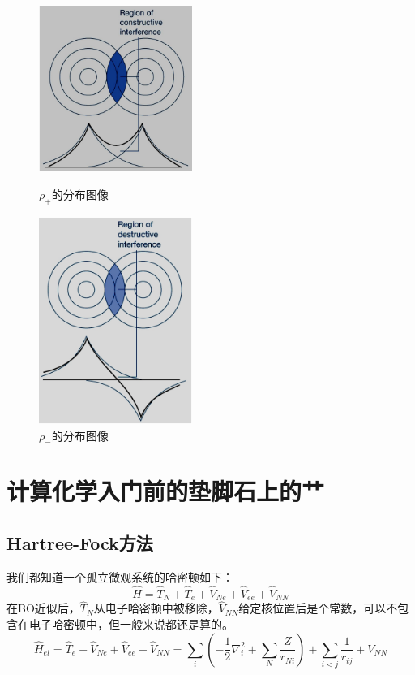 \begin{figure}[htbp]
    \centering
    \begin{minipage}[t]{0.48\textwidth}
    \centering
    \includegraphics[width=5cm]{fig/lzhx/微信图片_20211102112346.png}
    \caption{$\rho_+$的分布图像}
    \end{minipage}
    \begin{minipage}[t]{0.48\textwidth}
    \centering
    \includegraphics[width=5cm]{fig/lzhx/微信图片_202111021123461.png}
    \caption{$\rho_-$的分布图像}
    \end{minipage}
\end{figure}

\section{计算化学入门前的垫脚石上的艹}
\subsection{Hartree-Fock方法}
我们都知道一个孤立微观系统的哈密顿如下：
\[\hat{H}=\hat{T}_N+\hat{T}_e+\hat{V}_{Ne}+\hat{V}_{ee}+\hat{V}_{NN}\]
在BO近似后，$\hat{T}_N$从电子哈密顿中被移除，$\hat{V}_{NN}$给定核位置后是个常数，可以不包含在电子哈密顿中，但一般来说都还是算的。
\[\hat{H}_{el}=\hat{T}_e+\hat{V}_{Ne}+\hat{V}_{ee}+\hat{V}_{NN}=\sum_i\left(-\frac{1}{2}\nabla^2_i+\sum_N\frac{Z}{r_{Ni}}\right)+\sum_{i<j}\frac{1}{r_{ij}}+V_{NN}\]

